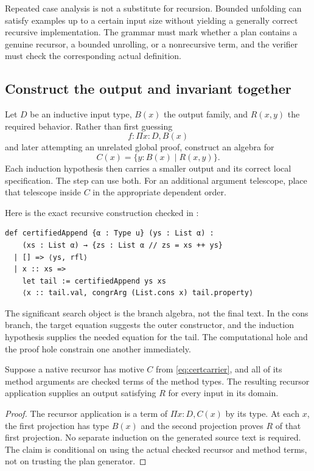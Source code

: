 Repeated case analysis is not a substitute for recursion. Bounded unfolding can satisfy examples up to a certain input size without yielding a generally correct recursive implementation. The grammar must mark whether a plan contains a genuine recursor, a bounded unrolling, or a nonrecursive term, and the verifier must check the corresponding actual definition.

\subsection{Construct the output and invariant together}
Let $D$ be an inductive input type, $B(x)$ the output family, and $R(x,y)$ the required behavior. Rather than first guessing
\[
 f:\Pi x:D,B(x)
\]
and later attempting an unrelated global proof, construct an algebra for
\begin{equation}\label{eq:certcarrier}
 C(x)=\{y:B(x)\mid R(x,y)\}.
\end{equation}
Each induction hypothesis then carries a smaller output and its correct local specification. The step can use both. For an additional argument telescope, place that telescope inside $C$ in the appropriate dependent order.

Here is the exact recursive construction checked in :
\begin{lstlisting}[caption={Checked reference construction, authored manually. The implementation and proof follow the same recursion.}]
def certifiedAppend {α : Type u} (ys : List α) :
    (xs : List α) → {zs : List α // zs = xs ++ ys}
  | [] => ⟨ys, rfl⟩
  | x :: xs =>
    let tail := certifiedAppend ys xs
    ⟨x :: tail.val, congrArg (List.cons x) tail.property⟩
\end{lstlisting}
The significant search object is the branch algebra, not the final text. In the cons branch, the target equation suggests the outer constructor, and the induction hypothesis supplies the needed equation for the tail. The computational hole and the proof hole constrain one another immediately.

\begin{proposition}
Suppose a native recursor has motive $C$ from \eqref{eq:certcarrier}, and all of its method arguments are checked terms of the method types. The resulting recursor application supplies an output satisfying $R$ for every input in its domain.
\end{proposition}
\begin{proof}
The recursor application is a term of $\Pi x:D,C(x)$ by its type. At each $x$, the first projection has type $B(x)$ and the second projection proves $R$ of that first projection. No separate induction on the generated source text is required. The claim is conditional on using the actual checked recursor and method terms, not on trusting the plan generator.
\end{proof}

